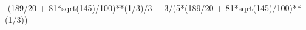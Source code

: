 \documentclass[preview]{standalone}
\begin{document}
\begin{center}
-(189/20 + 81*sqrt(145)/100)**(1/3)/3 + 3/(5*(189/20 + 81*sqrt(145)/100)**(1/3))
\end{center}
\end{document}
